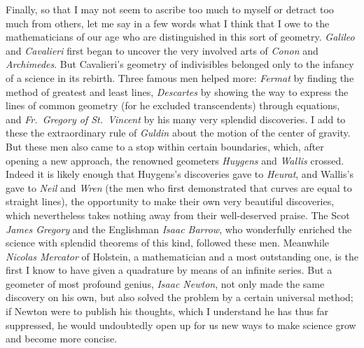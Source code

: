 \documentclass[twoside,openright]{article}
\begin{document}
Finally, so that I may not seem to ascribe too much to myself or detract too
much from others, let me say in a few words what I think that I owe to the
mathematicians of our age who are distinguished in this sort of geometry.
{\em Galileo} and {\em Cavalieri} first began to uncover the very involved
arts of {\em Conon} and {\em Archimedes}.  But Cavalieri's geometry of
indivisibles belonged only to the infancy of a science in its rebirth.  Three
famous men helped more: {\em Fermat} by finding the method of greatest and
least lines, {\em Descartes} by showing the way to express the lines of common
geometry (for he excluded transcendents) through equations, and {\em Fr.\
Gregory of St.\ Vincent} by his many very splendid discoveries.  I add to
these the extraordinary rule of {\em Guldin} about the motion of the center of
gravity.  But these men also came to a stop within certain boundaries, which,
after opening a new approach, the renowned geometers {\em Huygens} and
{\em Wallis} crossed.  Indeed it is likely enough that Huygens's discoveries
gave to {\em Heurat}, and Wallis's gave to {\em Neil} and {\em Wren} (the men
who first demonstrated that curves are equal to straight lines), the
opportunity to make their own very beautiful discoveries, which nevertheless
takes nothing away from their well-deserved praise.  The Scot {\em James
Gregory} and the Englishman {\em Isaac Barrow}, who wonderfully enriched the
science with splendid theorems of this kind, followed these men.  Meanwhile
{\em Nicolas Mercator} of Holstein, a mathematician and a most outstanding
one, is the first I know to have given a quadrature by means of an infinite
series.  But a geometer of most profound genius, {\em Isaac Newton}, not only
made the same discovery on his own, but also solved the problem by a certain
universal method; if Newton were to publish his thoughts, which I understand
he has thus far suppressed, he would undoubtedly open up for us new ways to
make science grow and become more concise.
\end{document}
